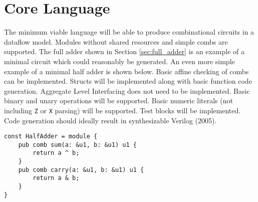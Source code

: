 \documentclass[10pt]{article}
\begin{document}
\begin{comment}
\subsection{Trigger Types}
\end{comment}

\begin{comment}
\subsection{Event Types}
\end{comment}

\begin{comment}
\subsection{Pipelines}
\end{comment}

\begin{comment}
\subsection{FSMs}
\end{comment}

\section{Core Language}

The minimum viable language will be able to produce combinational circuits in a dataflow model.
Modules without shared resources and simple combs are supported. The full adder shown in Section
\ref{sec:full_adder} is an example of a minimal circuit which could reasonably be generated. An even
more simple example of a minimal half adder is shown below. Basic affine checking of combs can be
implemented. Structs will be implemented along with basic function code generation. Aggregate Level
Interfacing does not need to be implemented. Basic binary and unary operations will be supported.
Basic numeric literals (not including \verb|Z| or \verb|X| parsing) will be supported. Test blocks
will be implemented. Code generation should ideally result in synthesizable Verilog (2005).

\begin{verbatim}
const HalfAdder = module {
    pub comb sum(a: &u1, b: &u1) u1 {
        return a ^ b;
    }
    pub comb carry(a: &u1, b: &u1) u1 {
        return a & b;
    }
}
\end{verbatim}
\end{document}
